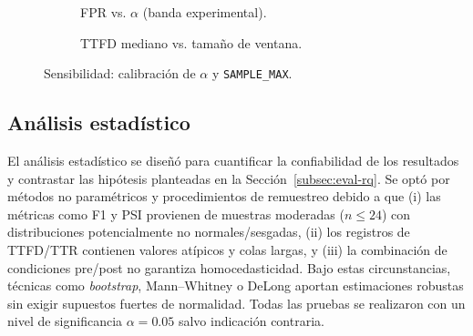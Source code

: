 \begin{figure}[htbp]
\centering
\begin{subfigure}[b]{0.48\textwidth}
\centering
{}
\caption{FPR vs. $\alpha$ (banda experimental).}
\end{subfigure}
\hfill
\begin{subfigure}[b]{0.48\textwidth}
\centering
{}
\caption{TTFD mediano vs. tamaño de ventana.}
\end{subfigure}
\caption{Sensibilidad: calibración de $\alpha$ y \texttt{SAMPLE\_MAX}.}
\label{fig:sensitivity-plots}
\end{figure}

\subsection{Análisis estadístico}
\label{subsec:eval-stats}

El análisis estadístico se diseñó para cuantificar la confiabilidad de los resultados y contrastar las hipótesis planteadas en la Sección~\ref{subsec:eval-rq}. Se optó por métodos no paramétricos y procedimientos de remuestreo debido a que (i) las métricas como F1 y PSI provienen de muestras moderadas ($n\leq 24$) con distribuciones potencialmente no normales/sesgadas, (ii) los registros de TTFD/TTR contienen valores atípicos y colas largas, y (iii) la combinación de condiciones pre/post no garantiza homocedasticidad. Bajo estas circunstancias, técnicas como \textit{bootstrap}, Mann–Whitney o DeLong aportan estimaciones robustas sin exigir supuestos fuertes de normalidad. Todas las pruebas se realizaron con un nivel de significancia $\alpha = 0.05$ salvo indicación contraria.

